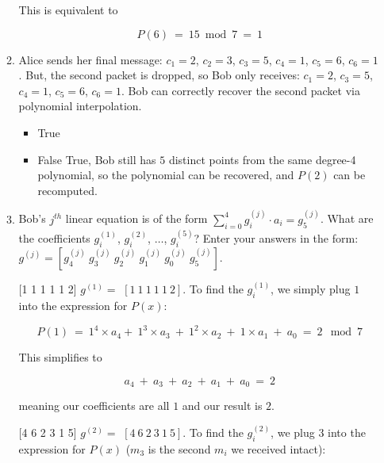 \documentclass[11pt,preview]{standalone} %
\begin{document}
\begin{enumerate}
\begin{enumerate}
\begin{Freeform}{1}
    This is equivalent to 

    $$P(6)\ =\ 15 \bmod 7\ =\ 1$$

    \end{Freeform}
    \item Alice sends her final message: $c_1 = 2$, $c_2 = 3$, $c_3 = 5$, $c_4 = 1$, $c_5 = 6$, $c_6 = 1$. But, the second packet is dropped, so Bob only receives: $c_1 = 2$, $c_3 = 5$, $c_4 = 1$, $c_5 = 6$, $c_6 = 1$. Bob can correctly recover the second packet via polynomial interpolation.
    \begin{Choices}
    \begin{itemize}
    \TrueChoice\item True
    \FalseChoice\item False
    \Solution True, Bob still has $5$ distinct points from the same degree-4 polynomial, so the polynomial can be recovered, and $P(2)$ can be recomputed.
    \end{itemize}
    \end{Choices}
    
    
    \item Bob's $j^{th}$ linear equation is of the form $\sum_{i = 0}^{4}{g_i^{(j)} \cdot a_i} = g_5^{(j)}$. What are the coefficients $g_i^{(1)}$, $g_i^{(2)}$, $\dotsc$, $g_i^{(5)}$? Enter your answers in the form: $g^{(j)} = [g_4^{(j)} \ g_3^{(j)} \ g_2^{(j)} \ g_1^{(j)} \ g_0^{(j)} \ g_5^{(j)}]$.
     \begin{Freeform}{[1 1 1 1 1 2]}
     $ g^{(1)} = $
     \Solution $[1\ 1\ 1\ 1\ 1\ 2]$. To find the $g_i^{(1)}$, we simply plug $1$ into the expression for $P(x)$:

     $$P(1)\ =\ 1^4 \times a_4 +\ 1^3 \times a_3\ +\ 1^2 \times a_2\ +\ 1 \times a_1\ +\ a_0\ =\ 2\ \bmod 7$$

     This simplifies to 

     $$a_4\ +\ a_3\ +\ a_2\ +\ a_1\ +\ a_0\ =\ 2$$

     meaning our coefficients are all $1$ and our result is $2$.
     \end{Freeform}
     \begin{Freeform}{[4 6 2 3 1 5]}
     $ g^{(2)} = $
     \Solution $[4\ 6\ 2\ 3\ 1\ 5]$. To find the $g_i^{(2)}$, we plug $3$ into the expression for $P(x)$ ($m_3$ is the second $m_i$ we received intact):


\end{Freeform}
\end{enumerate}
\end{enumerate}
\end{document}
